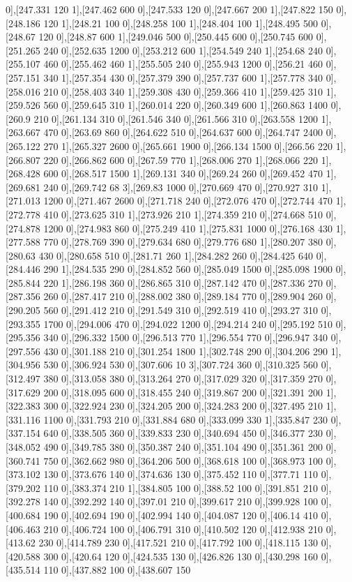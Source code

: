 {0],[247.331 120 1],[247.462 600 0],[247.533 120 0],[247.667 200 1],[247.822 150 0],[248.186 120 1],[248.21 100 0],[248.258 100 1],[248.404 100 1],[248.495 500 0],[248.67 120 0],[248.87 600 1],[249.046 500 0],[250.445 600 0],[250.745 600 0],[251.265 240 0],[252.635 1200 0],[253.212 600 1],[254.549 240 1],[254.68 240 0],[255.107 460 0],[255.462 460 1],[255.505 240 0],[255.943 1200 0],[256.21 460 0],[257.151 340 1],[257.354 430 0],[257.379 390 0],[257.737 600 1],[257.778 340 0],[258.016 210 0],[258.403 340 1],[259.308 430 0],[259.366 410 1],[259.425 310 1],[259.526 560 0],[259.645 310 1],[260.014 220 0],[260.349 600 1],[260.863 1400 0],[260.9 210 0],[261.134 310 0],[261.546 340 0],[261.566 310 0],[263.558 1200 1],[263.667 470 0],[263.69 860 0],[264.622 510 0],[264.637 600 0],[264.747 2400 0],[265.122 270 1],[265.327 2600 0],[265.661 1900 0],[266.134 1500 0],[266.56 220 1],[266.807 220 0],[266.862 600 0],[267.59 770 1],[268.006 270 1],[268.066 220 1],[268.428 600 0],[268.517 1500 1],[269.131 340 0],[269.24 260 0],[269.452 470 1],[269.681 240 0],[269.742 68 3],[269.83 1000 0],[270.669 470 0],[270.927 310 1],[271.013 1200 0],[271.467 2600 0],[271.718 240 0],[272.076 470 0],[272.744 470 1],[272.778 410 0],[273.625 310 1],[273.926 210 1],[274.359 210 0],[274.668 510 0],[274.878 1200 0],[274.983 860 0],[275.249 410 1],[275.831 1000 0],[276.168 430 1],[277.588 770 0],[278.769 390 0],[279.634 680 0],[279.776 680 1],[280.207 380 0],[280.63 430 0],[280.658 510 0],[281.71 260 1],[284.282 260 0],[284.425 640 0],[284.446 290 1],[284.535 290 0],[284.852 560 0],[285.049 1500 0],[285.098 1900 0],[285.844 220 1],[286.198 360 0],[286.865 310 0],[287.142 470 0],[287.336 270 0],[287.356 260 0],[287.417 210 0],[288.002 380 0],[289.184 770 0],[289.904 260 0],[290.205 560 0],[291.412 210 0],[291.549 310 0],[292.519 410 0],[293.27 310 0],[293.355 1700 0],[294.006 470 0],[294.022 1200 0],[294.214 240 0],[295.192 510 0],[295.356 340 0],[296.332 1500 0],[296.513 770 1],[296.554 770 0],[296.947 340 0],[297.556 430 0],[301.188 210 0],[301.254 1800 1],[302.748 290 0],[304.206 290 1],[304.956 530 0],[306.924 530 0],[307.606 10 3],[307.724 360 0],[310.325 560 0],[312.497 380 0],[313.058 380 0],[313.264 270 0],[317.029 320 0],[317.359 270 0],[317.629 200 0],[318.095 600 0],[318.455 240 0],[319.867 200 0],[321.391 200 1],[322.383 300 0],[322.924 230 0],[324.205 200 0],[324.283 200 0],[327.495 210 1],[331.116 1100 0],[331.793 210 0],[331.884 680 0],[333.099 330 1],[335.847 230 0],[337.154 640 0],[338.505 360 0],[339.833 230 0],[340.694 450 0],[346.377 230 0],[348.052 490 0],[349.785 380 0],[350.387 240 0],[351.104 490 0],[351.361 200 0],[360.741 750 0],[362.662 980 0],[364.206 500 0],[368.618 100 0],[368.973 100 0],[373.102 130 0],[373.676 140 0],[374.636 130 0],[375.452 110 0],[377.71 110 0],[379.202 110 0],[383.374 210 1],[384.805 100 0],[388.52 100 0],[391.851 210 0],[392.278 140 0],[392.292 140 0],[397.01 210 0],[399.617 210 0],[399.928 100 0],[400.684 190 0],[402.694 190 0],[402.994 140 0],[404.087 120 0],[406.14 410 0],[406.463 210 0],[406.724 100 0],[406.791 310 0],[410.502 120 0],[412.938 210 0],[413.62 230 0],[414.789 230 0],[417.521 210 0],[417.792 100 0],[418.115 130 0],[420.588 300 0],[420.64 120 0],[424.535 130 0],[426.826 130 0],[430.298 160 0],[435.514 110 0],[437.882 100 0],[438.607 150 }
